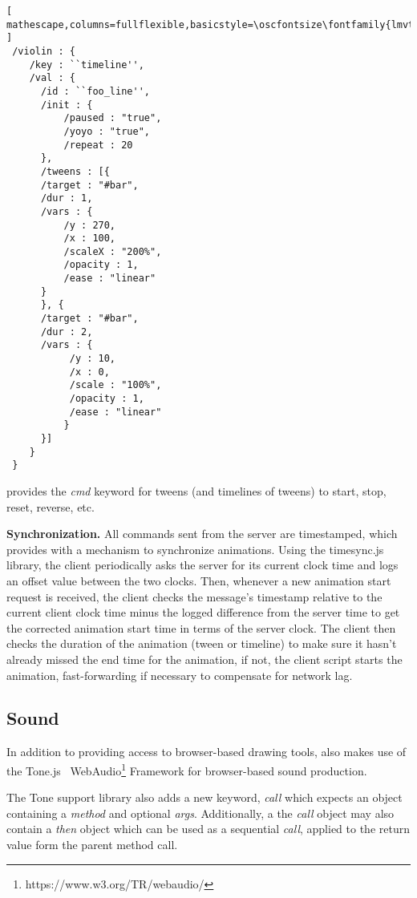 \begin{minipage}{\linewidth}
\begin{lstlisting}[ mathescape,columns=fullflexible,basicstyle=\oscfontsize\fontfamily{lmvtt}\selectfont ]
 /violin : {
    /key : ``timeline'',
    /val : {
      /id : ``foo_line'',
      /init : {
          /paused : "true",
          /yoyo : "true",
          /repeat : 20
      },
      /tweens : [{
	  /target : "#bar",
	  /dur : 1,
	  /vars : {
	      /y : 270,
	      /x : 100,
	      /scaleX : "200%",
	      /opacity : 1,
	      /ease : "linear"
	  }
      }, {
	  /target : "#bar",
	  /dur : 2,
	  /vars : {
	       /y : 10,
	       /x : 0,
	       /scale : "100%",
	       /opacity : 1,
	       /ease : "linear"
      	  }
      }]
    }
 }
\end{lstlisting}
\end{minipage}

\drawsocket provides the \textit{cmd} keyword for tweens (and timelines of tweens) to start, stop, reset, reverse, etc.

\medskip
\noindent
\textbf{Synchronization.} 
All commands sent from the server are timestamped, which provides \drawsocket with a mechanism to synchronize animations.
Using the timesync.js library, the client periodically asks the server for its current clock time and logs an offset value between the two clocks.
Then, whenever a new animation start request is received, the client checks the message's timestamp relative to the current client clock time minus the logged difference from the server time to get the corrected animation start time in terms of the server clock.
The client then checks the duration of the animation (tween or timeline) to make sure it hasn't already missed the end time for the animation, if not, the client script starts the animation, fast-forwarding if necessary to compensate for network lag.

\subsection{Sound}\label{sec:sound}
In addition to providing access to browser-based drawing tools, \drawsocket also makes use of the Tone.js~\cite{mann2015interactive} WebAudio\footnote{https://www.w3.org/TR/webaudio/} Framework for browser-based sound production.

The Tone support library also adds a new keyword, \textit{call} which expects an object containing a \textit{method} and optional \textit{args}. Additionally, a the \textit{call} object may also contain a \textit{then} object which can be used as a sequential \textit{call}, applied to the return value form the parent method call.

